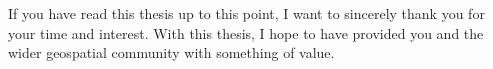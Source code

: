 If you have read this thesis up to this point, I want to sincerely thank you for your time and interest.
With this thesis, I hope to have provided you and the wider geospatial community with something of value.







  
  
  
  
  
  
  
  
  
  
